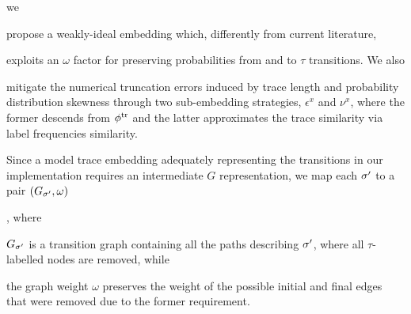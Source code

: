 {{{%
%
we
\begin{alphalist} \item propose a weakly-ideal embedding \cite{Gartner03} which, differently from current literature, \item exploits an
$\omega$ factor for preserving probabilities from and to $\tau$ transitions. We also \item mitigate the
numerical truncation errors induced by trace length and probability distribution skewness through two sub-embedding strategies,
$\epsilon^x$ and $\nu^x$, where the former descends from ${\phi^{\text{tr}}}$ and the latter approximates the trace similarity via label frequencies similarity.
\end{alphalist}
Since a model trace embedding  adequately representing the transitions in our implementation requires an intermediate $G$ representation, we map each ${\sigma'}$ to a pair $(G_{\sigma'},\omega)$}, where \begin{inparaenum}[\it (i)]
\item $G_{\sigma'}$ is a transition graph containing all the paths describing ${\sigma'}$, where all $\tau$-labelled nodes are removed, while
\item the graph weight $\omega$ preserves the weight of the possible initial and final edges that were removed due to the former requirement.
\end{inparaenum}

}}
